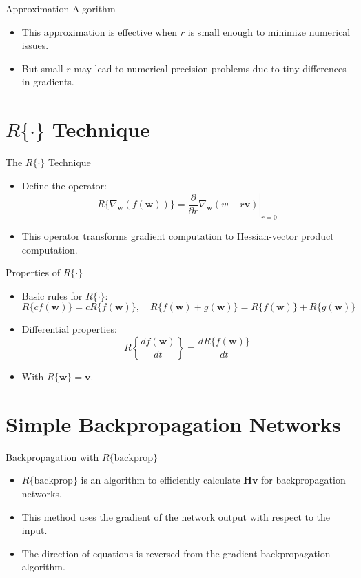 \documentclass{beamer}
\begin{document}
\begin{frame}{Approximation Algorithm}
    \begin{itemize}
        \item This approximation is effective when \( r \) is small enough to minimize numerical issues.
        \item But small \( r \) may lead to numerical precision problems due to tiny differences in gradients.
    \end{itemize}
\end{frame}

\section{\( R\{\cdot\} \) Technique}
\begin{frame}{The \( R\{\cdot\} \) Technique}
    \begin{itemize}
        \item Define the operator:
        \[
        R\{\nabla_{\mathbf{w}}(f(\mathbf{w}))\} = \left.\frac{\partial}{\partial r} \nabla_{\mathbf{w}}(w + r\mathbf{v})\right|_{r=0}
        \]
        \item This operator transforms gradient computation to Hessian-vector product computation.
    \end{itemize}
\end{frame}

\begin{frame}{Properties of \( R\{\cdot\} \)}
    \begin{itemize}
        \item Basic rules for \( R\{\cdot\} \):
        \[
        R\{cf(\mathbf{w})\} = c R\{f(\mathbf{w})\}, \quad R\{f(\mathbf{w}) + g(\mathbf{w})\} = R\{f(\mathbf{w})\} + R\{g(\mathbf{w})\}
        \]
        \item Differential properties:
        \[
        R\left\{\frac{df(\mathbf{w})}{dt}\right\} = \frac{dR\{f(\mathbf{w})\}}{dt}
        \]
        \item With \( R\{\mathbf{w}\} = \mathbf{v} \).
    \end{itemize}
\end{frame}

\section{Simple Backpropagation Networks}
\begin{frame}{Backpropagation with \( R\{\text{backprop}\} \)}
    \begin{itemize}
        \item \( R\{\text{backprop}\} \) is an algorithm to efficiently calculate \( \mathbf{H}\mathbf{v} \) for backpropagation networks.
        \item This method uses the gradient of the network output with respect to the input.
        \item The direction of equations is reversed from the gradient backpropagation algorithm.
    \end{itemize}
\end{frame}
\end{document}
